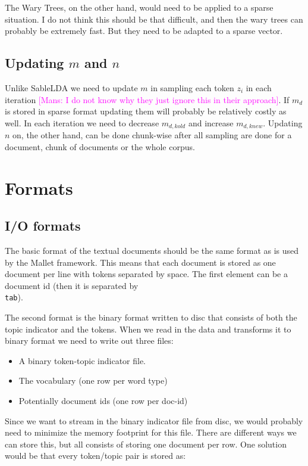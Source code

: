 \documentclass{article}
\newcommand{\mm}[1]{{\textcolor{magenta}{[Mans: #1]}}}
\begin{document}
The Wary Trees, on the other hand, would need to be applied to a sparse situation. I do not think this should be that difficult, and then the wary trees can probably be extremely fast. But they need to be adapted to a sparse vector.

\subsection{Updating $m$ and $n$}

Unlike SableLDA we need to update $m$ in sampling each token $z_i$ in each iteration \mm{I do not know why they just ignore this in their approach}. If $m_d$ is stored in sparse format updating them will probably be relatively costly as well. In each iteration we need to decrease $m_{d,kold}$ and increase $m_{d,knew}$. Updating $n$ on, the other hand, can be done chunk-wise after all sampling are done for a document, chunk of documents or the whole corpus.

\section{Formats}

\subsection{I/O formats}

The basic format of the textual documents should be the same format as is used by the Mallet framework. This means that each document is stored as one document per line with tokens separated by space. The first element can be a document id (then it is separated by \texttt{\\tab}).

The second format is the binary format written to disc that consists of both the topic indicator and the tokens. When we read in the data and transforms it to binary format we need to write out three files:

\begin{itemize}
  \item A binary token-topic indicator file.
  \item The vocabulary (one row per word type)
  \item Potentially document ids (one row per doc-id)
\end{itemize}

Since we want to stream in the binary indicator file from disc, we would probably need to minimize the memory footprint for this file. There are different ways we can store this, but all consists of storing one document per row. One solution would be that every token/topic pair is stored as:
\end{document}
